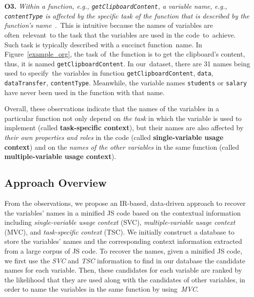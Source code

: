 \textbf{O3.} \textit{Within a function, e.g.,
  \texttt{getClipboardContent}, a variable name, e.g.,
  \texttt{contentType} is affected by the specific task of the
  function that is described by the function's
  name~\cite{sutton-fse15}}.~This is intuitive because the names of
variables are often~relevant~to the task that the variables are used
in the code~to~achieve. Such task is typically described with a
succinct function~name.
In Figure~\ref{example_org}, the task of~the function is to get the
clipboard's content, thus, it is named
\texttt{get\-ClipboardContent}. In our~dataset, there are 31
names being used to specify~the variables in function
\texttt{getClipboardContent}, \eg \texttt{data},
\texttt{dataTransfer}, \texttt{contentType}.
Meanwhile, the variable names \texttt{students}
or \texttt{salary} have never been used in the function with that
name.


Overall, these observations indicate that the names of the variables
in a particular function not only depend on {\em the task} in which
the variable is used to implement (called {\bf task-specific context}), but
their names are also affected by {\em their own properties and roles} in the
code (called {\bf single-variable usage context}) and on the {\em names of the
other variables} in the same function (called {\bf multiple-variable usage
  context}).

\subsection{Approach Overview}

From the observations, we propose an IR-based, data-driven approach to
recover the variables' names in a minified JS code based
on the contextual information
including \textit{single-variable usage context} (SVC),
\textit{multiple-variable usage context} (MVC), and
\textit{task-specific context} (TSC).
%
We initially construct a database to store
the variables' names and the corresponding context information
extracted from a large corpus of JS code.
%
To recover the names, given a minified JS code, we first use
the \textit{SVC} and \textit{TSC} information to find in our
database the candidate names for each variable. Then, these candidates
for each variable are ranked by the likelihood that they are used
along with the candidates of other variables, in order to name the
variables in the same function by using~\textit{MVC}.
